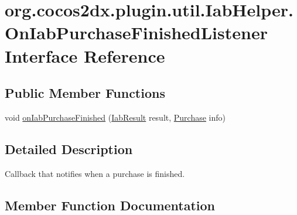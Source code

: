 \hypertarget{interfaceorg_1_1cocos2dx_1_1plugin_1_1util_1_1IabHelper_1_1OnIabPurchaseFinishedListener}{}\section{org.\+cocos2dx.\+plugin.\+util.\+Iab\+Helper.\+On\+Iab\+Purchase\+Finished\+Listener Interface Reference}
\label{interfaceorg_1_1cocos2dx_1_1plugin_1_1util_1_1IabHelper_1_1OnIabPurchaseFinishedListener}
\subsection*{Public Member Functions}
\begin{DoxyCompactItemize}
\item 
void \hyperlink{interfaceorg_1_1cocos2dx_1_1plugin_1_1util_1_1IabHelper_1_1OnIabPurchaseFinishedListener_ad9d51ea93b20989462d744bbeedd9e94}{on\+Iab\+Purchase\+Finished} (\hyperlink{classorg_1_1cocos2dx_1_1plugin_1_1util_1_1IabResult}{Iab\+Result} result, \hyperlink{classorg_1_1cocos2dx_1_1plugin_1_1util_1_1Purchase}{Purchase} info)
\end{DoxyCompactItemize}


\subsection{Detailed Description}
Callback that notifies when a purchase is finished. 

\subsection{Member Function Documentation}
\mbox{\label{interfaceorg_1_1cocos2dx_1_1plugin_1_1util_1_1IabHelper_1_1OnIabPurchaseFinishedListener_ad9d51ea93b20989462d744bbeedd9e94}} 
